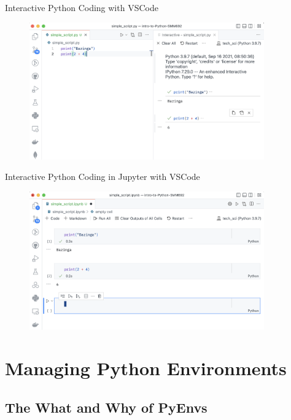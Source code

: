 \documentclass[aspectratio=1610]{beamer}
\begin{document}
\begin{frame}{Interactive Python Coding with VSCode}
		\begin{figure}
			\includegraphics[width=0.9\textwidth]{images/vscode}
		\end{figure}
\end{frame}

\begin{frame}{Interactive Python Coding in Jupyter with VSCode}
		\begin{figure}
			\includegraphics[width=0.9\textwidth]{images/jupyter_in_vscode}
		\end{figure}
\end{frame}

\section{Managing Python Environments}

\subsection{The What and Why of PyEnvs}
\end{document}
